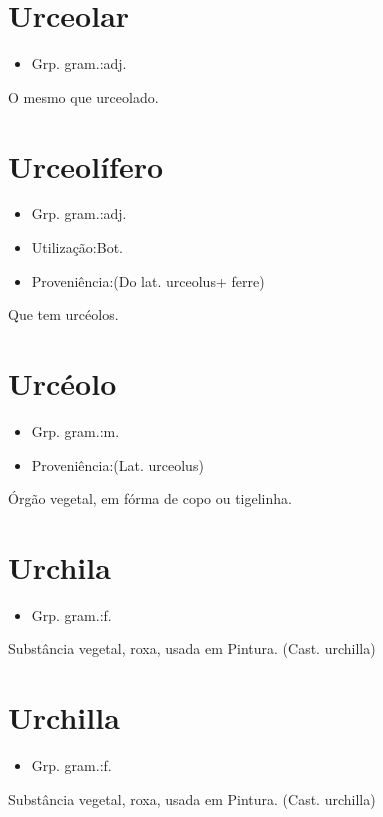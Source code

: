 \documentclass{article}
\begin{document}
\section{Urceolar}
\begin{itemize}
\item {Grp. gram.:adj.}
\end{itemize}
O mesmo que \textunderscore urceolado\textunderscore .
\section{Urceolífero}
\begin{itemize}
\item {Grp. gram.:adj.}
\end{itemize}
\begin{itemize}
\item {Utilização:Bot.}
\end{itemize}
\begin{itemize}
\item {Proveniência:(Do lat. \textunderscore urceolus\textunderscore  + \textunderscore ferre\textunderscore )}
\end{itemize}
Que tem urcéolos.
\section{Urcéolo}
\begin{itemize}
\item {Grp. gram.:m.}
\end{itemize}
\begin{itemize}
\item {Proveniência:(Lat. \textunderscore urceolus\textunderscore )}
\end{itemize}
Órgão vegetal, em fórma de copo ou tigelinha.
\section{Urchila}
\begin{itemize}
\item {Grp. gram.:f.}
\end{itemize}
Substância vegetal, roxa, usada em Pintura.
(Cast. \textunderscore urchilla\textunderscore )
\section{Urchilla}
\begin{itemize}
\item {Grp. gram.:f.}
\end{itemize}
Substância vegetal, roxa, usada em Pintura.
(Cast. \textunderscore urchilla\textunderscore )
\end{document}
